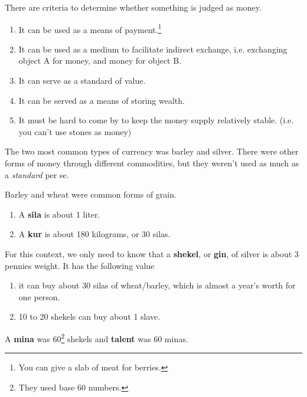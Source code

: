 \documentclass{article}
\begin{document}
    \begin{definition}[Money]
      There are criteria to determine whether something is judged as money. 
      \begin{enumerate}
        \item It can be used as a means of payment.\footnote{You can give a slab of meat for berries. } 
        \item It can be used as a medium to facilitate indirect exchange, i.e. exchanging object A for money, and money for object B. 
        \item It can serve as a standard of value. 
        \item It can be served as a means of storing wealth. 
        \item It must be hard to come by to keep the money supply relatively stable. (i.e. you can't use stones as money)
      \end{enumerate}
    \end{definition}

    The two most common types of currency was barley and silver. There were other forms of money through different commodities, but they weren't used as much as a \textit{standard} per se. 

    \begin{definition} 
      Barley and wheat were common forms of grain. 
      \begin{enumerate}
        \item A \textbf{sila} is about 1 liter. 
        \item A \textbf{kur} is about 180 kilograms, or 30 silas.
      \end{enumerate}
    \end{definition}

    \begin{definition}
      For this context, we only need to know that a \textbf{shekel}, or \textbf{gin}, of silver is about 3 pennies weight. It has the following value 
      \begin{enumerate}
        \item it can buy about 30 silas of wheat/barley, which is almost a year's worth for one person. 
        \item 10 to 20 shekels can buy about 1 slave. 
      \end{enumerate}
      A \textbf{mina} was 60\footnote{They used base 60 numbers.} shekels and \textbf{talent} was 60 minas. 
    \end{definition}
\end{document}
